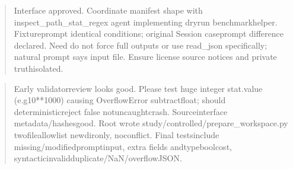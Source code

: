 \documentclass[10pt,letterpaper]{article}
\begin{document}
\begin{quote}\small
Interface approved. Coordinate manifest shape with inspect\_path\_stat\_regex agent implementing dryrun benchmarkhelper. Fixtureprompt identical conditions; original Session caseprompt difference declared. Need do not force full outputs or use read\_json specifically; natural prompt says input file. Ensure license source notices and private truthisolated.
\end{quote}

\begin{quote}\small
Early validatorreview looks good. Please test huge integer stat.value (e.g10**1000) causing OverflowError subtractfloat; should deterministicreject false notuncaughtcrash. Sourceinterface metadata/hashesgood. Root wrote study/controlled/prepare\_workspace.py twofileallowlist newdironly, noconflict. Final testsinclude missing/modifiedpromptinput, extra fields andtypeboolcost, syntacticinvalidduplicate/NaN/overflowJSON.
\end{quote}
\end{document}
